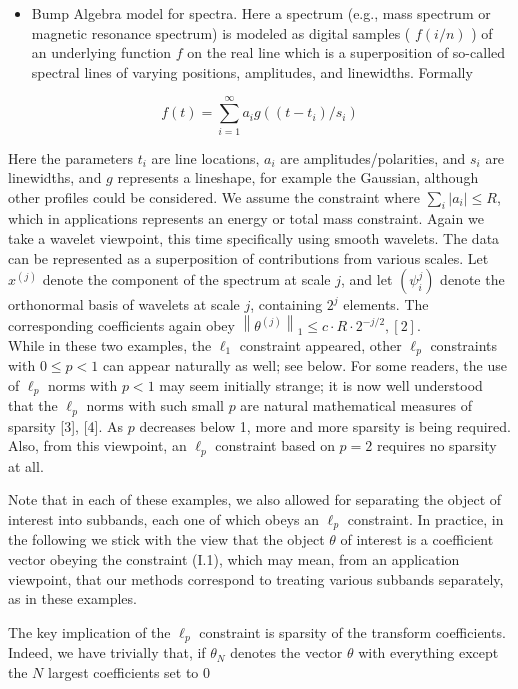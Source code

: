 \documentclass[10pt]{article}
\begin{document}
\begin{itemize}
  \item Bump Algebra model for spectra. Here a spectrum (e.g., mass spectrum or magnetic resonance spectrum) is modeled as digital samples ( $f(i / n)$ ) of an underlying function $f$ on the real line which is a superposition of so-called spectral lines of varying positions, amplitudes, and linewidths. Formally
\end{itemize}

$$
f(t)=\sum_{i=1}^{\infty} a_{i} g\left(\left(t-t_{i}\right) / s_{i}\right)
$$

Here the parameters $t_{i}$ are line locations, $a_{i}$ are amplitudes/polarities, and $s_{i}$ are linewidths, and $g$ represents a lineshape, for example the Gaussian, although other profiles could be considered. We assume the constraint where $\sum_{i}\left|a_{i}\right| \leq R$, which in applications represents an energy or total mass constraint. Again we take a wavelet viewpoint, this time specifically using smooth wavelets. The data can be represented as a superposition of contributions from various scales. Let $x^{(j)}$ denote the component of the spectrum at scale $j$, and let $\left(\psi_{i}^{j}\right)$ denote the orthonormal basis of wavelets at scale $j$, containing $2^{j}$ elements. The corresponding coefficients again obey $\left\|\theta^{(j)}\right\|_{1} \leq c \cdot R \cdot 2^{-j / 2},[2]$.\\
While in these two examples, the $\ell_{1}$ constraint appeared, other $\ell_{p}$ constraints with $0 \leq p<1$ can appear naturally as well; see below. For some readers, the use of $\ell_{p}$ norms with $p<1$ may seem initially strange; it is now well understood that the $\ell_{p}$ norms with such small $p$ are natural mathematical measures of sparsity [3], [4]. As $p$ decreases below 1, more and more sparsity is being required. Also, from this viewpoint, an $\ell_{p}$ constraint based on $p=2$ requires no sparsity at all.

Note that in each of these examples, we also allowed for separating the object of interest into subbands, each one of which obeys an $\ell_{p}$ constraint. In practice, in the following we stick with the view that the object $\theta$ of interest is a coefficient vector obeying the constraint (I.1), which may mean, from an application viewpoint, that our methods correspond to treating various subbands separately, as in these examples.

The key implication of the $\ell_{p}$ constraint is sparsity of the transform coefficients. Indeed, we have trivially that, if $\theta_{N}$ denotes the vector $\theta$ with everything except the $N$ largest coefficients set to 0
\end{document}
